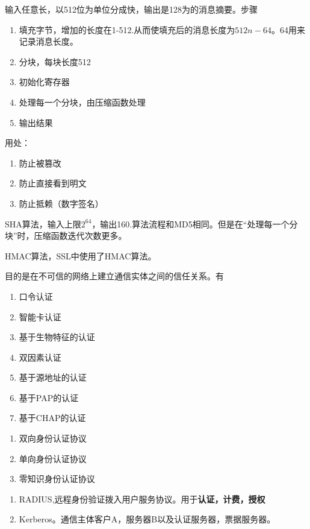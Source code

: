 \begin{description}
	\item[MD5] 输入任意长，以512位为单位分成快，输出是128为的消息摘要。步骤
	\begin{enumerate}
		\item 填充字节，增加的长度在1-512.从而使填充后的消息长度为$ 512n-64 $。64用来记录消息长度。
		\item 分块，每块长度512
		\item 初始化寄存器
		\item 处理每一个分块，由压缩函数处理
		\item 输出结果
	\end{enumerate}
	用处：
	\begin{enumerate}
		\item 防止被篡改
		\item 防止直接看到明文
		\item 防止抵赖（数字签名）
	\end{enumerate}
	\item SHA算法，输入上限$ 2^64 $，输出160.算法流程和MD5相同。但是在“处理每一个分块”时，压缩函数迭代次数更多。
	\item HMAC算法，SSL中使用了HMAC算法。
\end{description}

 目的是在不可信的网络上建立通信实体之间的信任关系。有
\begin{enumerate}
	\item 口令认证
	\item 智能卡认证
	\item 基于生物特征的认证
	\item 双因素认证
	\item 基于源地址的认证
	\item 基于PAP的认证
	\item 基于CHAP的认证
\end{enumerate}

\begin{enumerate}
	\item 双向身份认证协议
	\item 单向身份认证协议
	\item 零知识身份认证协议
\end{enumerate}

\begin{enumerate}
	\item RADIUS,远程身份验证拨入用户服务协议。用于\textbf{认证，计费，授权}
	\item Kerberos。通信主体客户A，服务器B以及认证服务器，票据服务器。
\end{enumerate}